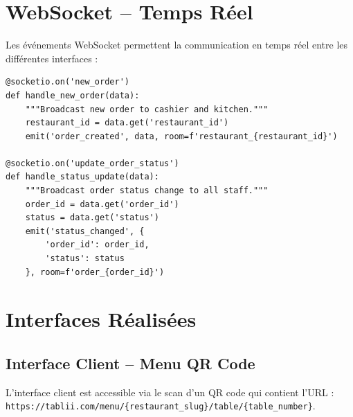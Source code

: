 \documentclass[12pt,a4paper]{report}
\begin{document}
\section{WebSocket -- Temps Réel}

Les événements WebSocket permettent la communication en temps réel entre les différentes interfaces :

\begin{lstlisting}[caption={WebSocket Events -- \texttt{app/events/order\_events.py}}]
@socketio.on('new_order')
def handle_new_order(data):
    """Broadcast new order to cashier and kitchen."""
    restaurant_id = data.get('restaurant_id')
    emit('order_created', data, room=f'restaurant_{restaurant_id}')

@socketio.on('update_order_status')
def handle_status_update(data):
    """Broadcast order status change to all staff."""
    order_id = data.get('order_id')
    status = data.get('status')
    emit('status_changed', {
        'order_id': order_id,
        'status': status
    }, room=f'order_{order_id}')
\end{lstlisting}

\section{Interfaces Réalisées}

\subsection{Interface Client -- Menu QR Code}

L'interface client est accessible via le scan d'un QR code qui contient l'URL :
\texttt{https://tablii.com/menu/\{restaurant\_slug\}/table/\{table\_number\}}.
\end{document}
